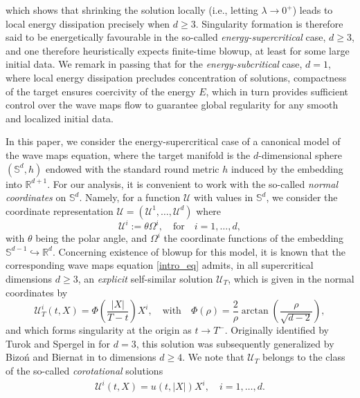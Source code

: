 \documentclass[12pt,reqno]{amsart}
\theoremstyle{plain}
\theoremstyle{remark}
\theoremstyle{plain}
\theoremstyle{definition}
\numberwithin{equation}{section}
\numberwithin{equation}{section}
\newcommand{\la}{\lambda}
\def\R{{\mathbb R}}
\renewcommand{\S}{\mathbb{S}}
\begin{document}
	which shows that shrinking the solution locally (i.e., letting $\la \rightarrow 0^+$) leads to local energy dissipation precisely when $d \geq 3$. Singularity formation is therefore said to be energetically favourable in the so-called \emph{energy-supercritical} case, $d \geq 3$, and one therefore heuristically expects finite-time blowup, at least for some large initial data.
	We remark in passing that for the \emph{energy-subcritical} case, $d=1$, where local energy dissipation precludes concentration of solutions, compactness of the target ensures coercivity of the energy $E$, which in turn provides sufficient control over the wave maps flow to guarantee global regularity for any smooth and localized initial data.
	
	In this paper, we consider the energy-supercritical case of a canonical model of the wave maps equation, where the target manifold is the $d$-dimensional sphere $(\S^d, h)$ endowed with the standard round metric $h$ induced by the embedding into $\R^{d+1}$. For our analysis, it is convenient to work with the so-called \emph{normal coordinates} on $\S^d$. Namely, for a function $\mathcal{U}$ with values in $\S^d$, we consider the coordinate representation $\mathcal{U}=(\mathcal{U}^1,\dots,\mathcal{U}^d)$ where 
	\begin{equation*}
		\mathcal{U}^i := \theta \Omega^i, \quad \text{for} \quad i=1,\dots,d,
	\end{equation*}
	with $\theta$ being the polar angle, and $\Omega^i$ the coordinate functions of the embedding $\S^{d-1} \hookrightarrow \R^d$.
	Concerning existence of blowup for this model, it is known that the corresponding wave maps equation \eqref{intro_eq} admits, in all supercritical dimensions $d \geq 3$, an \emph{explicit} self-similar solution $\mathcal{U}_T$, which is given in the normal coordinates by
	\begin{equation}\label{Def:BizBie_sol}
		\mathcal{U}^i_T(t,X)= \Phi\left( \frac{|X|}{T-t} \right)X^i, \quad \text{with} \quad \Phi(\rho)=\frac{2}{\rho}\arctan\left(\frac{\rho}{\sqrt{d-2}}\right),
	\end{equation}
	and which forms singularity at the origin as $t \rightarrow T^-$.
	Originally identified by Turok and Spergel in \cite{turok1990global} for $d=3$, this solution was subsequently generalized by Bizo\'n and Biernat in \cite{bizon2015generic} to dimensions $d \geq 4$. We note that $\mathcal{U}_T$  belongs to the class of the so-called \emph{corotational} solutions
	\begin{align}\label{Def:Corrotationa_ansatz}
		\mathcal{U}^{i}(t,X)=u(t,\lvert X\rvert)X^i,\quad i=1,\dots, d.
	\end{align}
\end{document}
